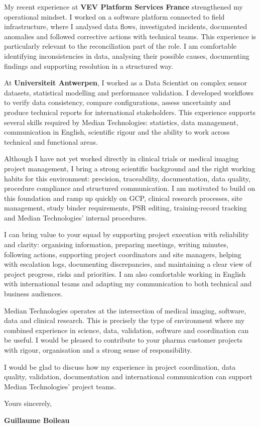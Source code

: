 \documentclass[11pt,a4paper]{altacv}
\begin{document}
{My recent experience at \textbf{VEV Platform Services France} strengthened my operational mindset. I worked on a software platform connected to field infrastructure, where I analysed data flows, investigated incidents, documented anomalies and followed corrective actions with technical teams. This experience is particularly relevant to the reconciliation part of the role. I am comfortable identifying inconsistencies in data, analysing their possible causes, documenting findings and supporting resolution in a structured way.

At \textbf{Universiteit Antwerpen}, I worked as a Data Scientist on complex sensor datasets, statistical modelling and performance validation. I developed workflows to verify data consistency, compare configurations, assess uncertainty and produce technical reports for international stakeholders. This experience supports several skills required by Median Technologies: statistics, data management, communication in English, scientific rigour and the ability to work across technical and functional areas.

Although I have not yet worked directly in clinical trials or medical imaging project management, I bring a strong scientific background and the right working habits for this environment: precision, traceability, documentation, data quality, procedure compliance and structured communication. I am motivated to build on this foundation and ramp up quickly on GCP, clinical research processes, site management, study binder requirements, PSR editing, training-record tracking and Median Technologies' internal procedures.

I can bring value to your squad by supporting project execution with reliability and clarity: organising information, preparing meetings, writing minutes, following actions, supporting project coordinators and site managers, helping with escalation logs, documenting discrepancies, and maintaining a clear view of project progress, risks and priorities. I am also comfortable working in English with international teams and adapting my communication to both technical and business audiences.

Median Technologies operates at the intersection of medical imaging, software, data and clinical research. This is precisely the type of environment where my combined experience in science, data, validation, software and coordination can be useful. I would be pleased to contribute to your pharma customer projects with rigour, organisation and a strong sense of responsibility.

I would be glad to discuss how my experience in project coordination, data quality, validation, documentation and international communication can support Median Technologies' project teams.

Yours sincerely,

\textbf{Guillaume Boileau}

}
\end{document}

